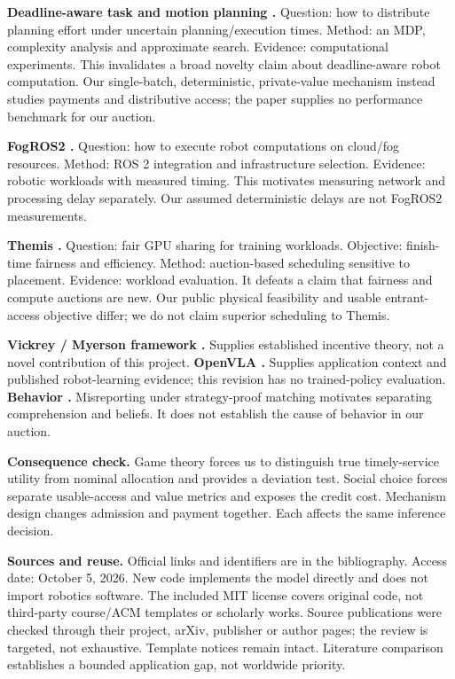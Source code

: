 \textbf{Deadline-aware task and motion planning \cite{sung}.} Question: how to distribute planning effort under uncertain planning/execution times. Method: an MDP, complexity analysis and approximate search. Evidence: computational experiments. This invalidates a broad novelty claim about deadline-aware robot computation. Our single-batch, deterministic, private-value mechanism instead studies payments and distributive access; the paper supplies no performance benchmark for our auction.

\textbf{FogROS2 \cite{fogros}.} Question: how to execute robot computations on cloud/fog resources. Method: ROS 2 integration and infrastructure selection. Evidence: robotic workloads with measured timing. This motivates measuring network and processing delay separately. Our assumed deterministic delays are not FogROS2 measurements.

\textbf{Themis \cite{themis}.} Question: fair GPU sharing for training workloads. Objective: finish-time fairness and efficiency. Method: auction-based scheduling sensitive to placement. Evidence: workload evaluation. It defeats a claim that fairness and compute auctions are new. Our public physical feasibility and usable entrant-access objective differ; we do not claim superior scheduling to Themis.

\textbf{Vickrey / Myerson framework \cite{vickrey,roughgarden}.} Supplies established incentive theory, not a novel contribution of this project. \textbf{OpenVLA \cite{openvla}.} Supplies application context and published robot-learning evidence; this revision has no trained-policy evaluation. \textbf{Behavior \cite{hassidim}.} Misreporting under strategy-proof matching motivates separating comprehension and beliefs. It does not establish the cause of behavior in our auction.

\textbf{Consequence check.} Game theory forces us to distinguish true timely-service utility from nominal allocation and provides a deviation test. Social choice forces separate usable-access and value metrics and exposes the credit cost. Mechanism design changes admission and payment together. Each affects the same inference decision.

\textbf{Sources and reuse.} Official links and identifiers are in the bibliography. Access date: October 5, 2026. New code implements the model directly and does not import robotics software. The included MIT license covers original code, not third-party course/ACM templates or scholarly works. Source publications were checked through their project, arXiv, publisher or author pages; the review is targeted, not exhaustive. Template notices remain intact. Literature comparison establishes a bounded application gap, not worldwide priority.

